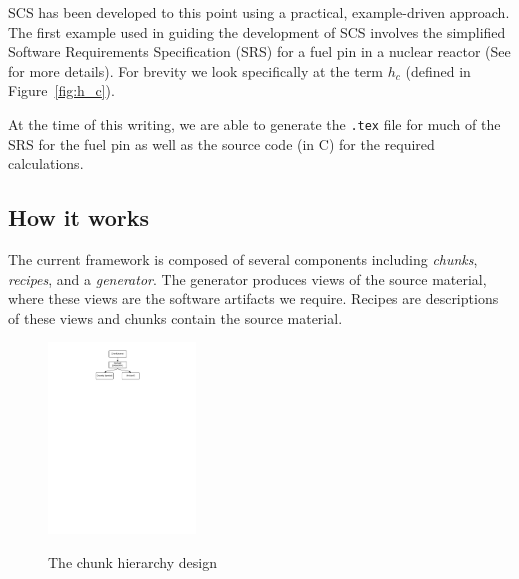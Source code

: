\documentclass{sig-alternate-05-2015}
\newcommand{\lss}{SCS}
\begin{document}
\lss{} has been developed to this point using a practical, example-driven
approach. The first example used in guiding the development of \lss{} involves
the simplified Software Requirements Specification (SRS) for a fuel pin in a
nuclear reactor (See \cite{SmithAndKoothoor2016} for more details). For brevity
we look specifically at the term $h_c$ (defined in Figure~\ref{fig:h_c}).

At the time of this writing, we are able to generate the \verb|.tex| file for
much of the SRS for the fuel pin as well as the source code (in C) for the
required calculations.

\subsection{How it works} \label{sssec:ex_how}

The current framework is composed of several components including
\textit{chunks}, \textit{recipes}, and a \textit{generator}. The generator
produces views of the source material, where these views are the software
artifacts we require. Recipes are descriptions of these views and chunks contain
the source material.


\begin{figure}
\begin{center}
{
 \includegraphics[width=0.35\textwidth]{ChunkHierarchy.pdf}
}
\end{center}
\caption{The chunk hierarchy design}
\label{fig:chunks}
\end{figure}
\end{document}
